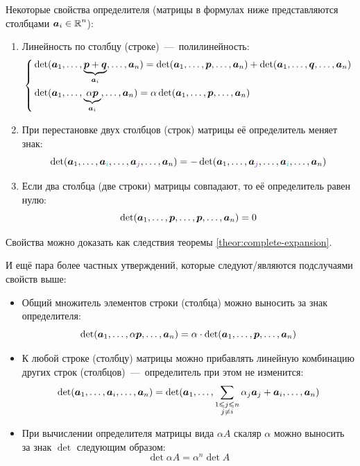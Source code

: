 \documentclass[a4paper,12pt]{article}
\begin{document}
  \begin{theorem}
    Некоторые свойства определителя (матрицы в формулах ниже представляются столбцами $\bds a_i \hm\in \RR^n$):
    \begin{enumerate}
      \item Линейность по столбцу (строке)~---~полилинейность:
        \[
          \left\{
            \begin{aligned}
              &\det (\boldsymbol a_1, \ldots, \underbrace{\boldsymbol p + \boldsymbol q}_{\boldsymbol a_i}, \ldots, \boldsymbol a_n)
                = \det (\boldsymbol a_1, \ldots, \boldsymbol p, \ldots, \boldsymbol a_n)
                + \det (\boldsymbol a_1, \ldots, \boldsymbol q, \ldots, \boldsymbol a_n)\\
              &\det (\boldsymbol a_1, \ldots, \underbrace{\alpha \boldsymbol p}_{\boldsymbol a_i}, \ldots, \boldsymbol a_n)
                = \alpha \det (\boldsymbol a_1, \ldots, \boldsymbol p, \ldots, \boldsymbol a_n)
            \end{aligned}
          \right.
        \]
      \item При перестановке двух столбцов (строк) матрицы её определитель меняет знак:
        \[
          \det (\bds a_1, \ldots, \bds a_{\textcolor{light-cyan}{i}}, \ldots, \bds a_{\textcolor{light-purple}{j}}, \ldots, \bds a_n)
          = -\det (\bds a_1, \ldots, \bds a_{\textcolor{light-purple}{j}}, \ldots, \bds a_{\textcolor{light-cyan}{i}}, \ldots, \bds a_n)
        \]
      \item Если два столбца (две строки) матрицы совпадают, то её определитель равен нулю:
        \[
          \det (\boldsymbol a_1, \ldots, \boldsymbol p, \ldots, \boldsymbol p, \ldots, \boldsymbol a_n) = 0
        \]
    \end{enumerate}
    
  \end{theorem}
  
  Свойства можно доказать как следствия теоремы \ref{theor:complete-expansion}.
  
  И ещё пара более частных утверждений, которые следуют/являются подслучаями свойств выше:
  \begin{itemize}
    \item Общий множитель элементов строки (столбца) можно выносить за знак определителя:
      \[
        \det (\boldsymbol a_1, \ldots, \alpha \boldsymbol p, \ldots, \boldsymbol a_n)
          = \alpha \cdot \det (\boldsymbol a_1, \ldots, \boldsymbol p, \ldots, \boldsymbol a_n)
      \]
    \item К любой строке (столбцу) матрицы можно прибавлять линейную комбинацию других строк (столбцов)~---~определитель при этом не изменится:
      \[
        \det (\boldsymbol a_1, \ldots, \boldsymbol a_i, \ldots, \boldsymbol a_n)
          = \det (\boldsymbol a_1, \ldots, \sum_{\substack{1 \leqslant j \leqslant n\\j \not= i}} \alpha_j \boldsymbol a_j + \boldsymbol a_i, \ldots, \boldsymbol a_n)
      \]
    \item При вычислении определителя матрицы вида $\alpha A$ скаляр $\alpha$ можно выносить за знак $\det$ следующим образом:
      \[
        \det \alpha A = \alpha^n \det A
      \]
  \end{itemize}
  
\end{document}
